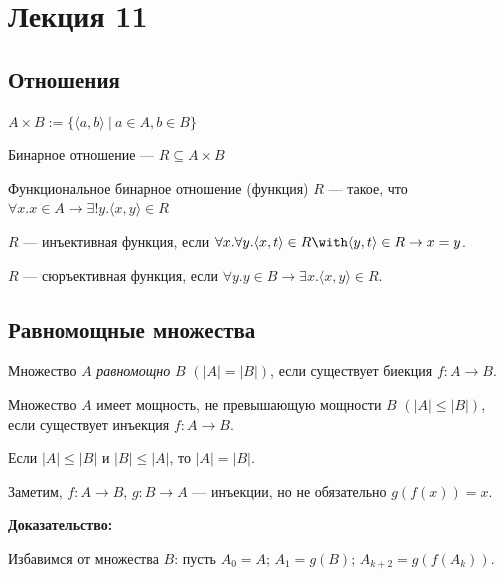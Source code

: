 
\section{Лекция 11}
\subsection{Отношения}

 $A \times B := \{\langle a,b \rangle\ |\ a \in A, b \in B\}$


Бинарное отношение --- $R \subseteq A \times B$

Функциональное бинарное отношение (функция) $R$ --- такое, что $\forall x.x\in A\rightarrow\exists !y.\langle x,y\rangle \in R$

$R$ --- инъективная функция, если $\forall x.\forall y.\langle x,t\rangle \in R\with \langle y,t\rangle \in R \rightarrow x=y$.

$R$ --- сюръективная функция, если $\forall y.y \in B\rightarrow\exists x.\langle x,y\rangle\in R$.

\subsection{Равномощные множества}

Множество $A$ \emph{равномощно} $B$ $(|A|=|B|)$, если существует биекция $f: A \rightarrow B$.

Множество $A$ имеет мощность, не превышающую мощности $B$ $(|A|\le|B|)$, если существует инъекция $f: A \rightarrow B$.



Если $|A| \le |B|$ и $|B| \le |A|$, то $|A| = |B|$.

Заметим, $f: A \rightarrow B$, $g: B \rightarrow A$ --- инъекции, но не обязательно $g(f(x)) = x$.

\textbf{Доказательство:}

Избавимся от множества $B$: пусть $A_0 = A$; $A_1 = g(B)$; $A_{k+2} = g(f(A_k))$.   


